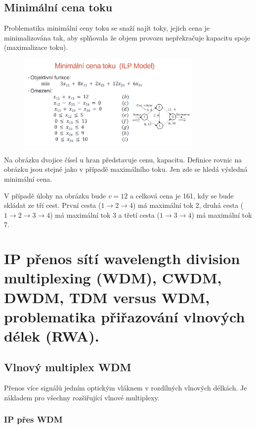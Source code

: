 \subsection{Minimální cena toku}

Problematika minimální ceny toku se snaží najít toky, jejich cena je minimalizována tak, aby splňovala že objem provozu nepřekračuje kapacitu spoje (maximalizace toku).

\begin{figure} [h]
    \centering
    \includegraphics[width=0.8\textwidth]{snimky/MinCena.png}
\end{figure}

Na obrázku dvojice čísel u hran představuje cenu, kapacitu. Definice rovnic na obrázku jsou stejné jako v případě maximálního toku. Jen zde se hledá výsledná minimální cena.

V případě úlohy na obrázku bude $v = 12$ a celková cena je 161, kdy se bude skládat ze tří cest. První cesta ($1\xrightarrow{}2\xrightarrow{}4$) má maximální tok 2, druhá cesta ($1\xrightarrow{}2\xrightarrow{}3\xrightarrow{}4$) má maximální tok 3 a třetí cesta ($1\xrightarrow{}3\xrightarrow{}4$) má maximální tok 7.



\clearpage
\section{IP přenos sítí wavelength division multiplexing (WDM), CWDM, DWDM, TDM versus WDM, problematika přiřazování vlnových délek (RWA).}

\subsection{Vlnový multiplex WDM}

Přenos více signálů jedním optickým vláknem v rozdílných vlnových délkách. Je základem pro všechny rozšiřující vlnové multiplexy.

\subsubsection{IP přes WDM}

